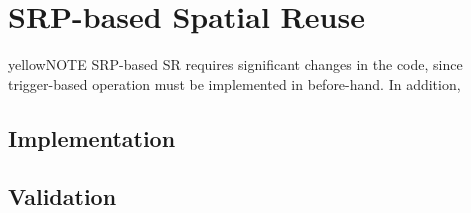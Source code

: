 \documentclass[]{article}
\begin{document}
	
	\section{SRP-based Spatial Reuse} 
	\label{section:srp_sr}
	
	\begin{mybox}{yellow}{NOTE}
		SRP-based SR requires significant changes in the code, since trigger-based operation must be implemented in before-hand. In addition, 	
	\end{mybox}
	
	\subsection{Implementation}
	
	\subsection{Validation}
	
	
	
	
\end{document}
